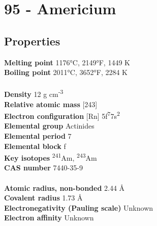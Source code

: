 \section{95 - Americium}
\label{sec:elem-americium}
\subsection{Properties}
\textbf{Melting point} 1176°C, 2149°F, 1449 K\\
\textbf{Boiling point} 2011°C, 3652°F, 2284 K\\
\\
\textbf{Density} 12 g cm\textsuperscript{-3}\\
\textbf{Relative atomic mass} [243]\\
\textbf{Electron configuration} [Rn] 5f\textsuperscript{7}7s\textsuperscript{2}\\
\textbf{Elemental group} Actinides\\
\textbf{Elemental period} 7\\
\textbf{Elemental block} f\\
\textbf{Key isotopes} \textsuperscript{241}Am, \textsuperscript{243}Am\\
\textbf{CAS number} 7440-35-9\\
\\
\textbf{Atomic radius, non-bonded} 2.44 Å\\
\textbf{Covalent radius} 1.73 Å\\
\textbf{Electronegativity (Pauling scale)} Unknown\\
\textbf{Electron affinity} Unknown\\